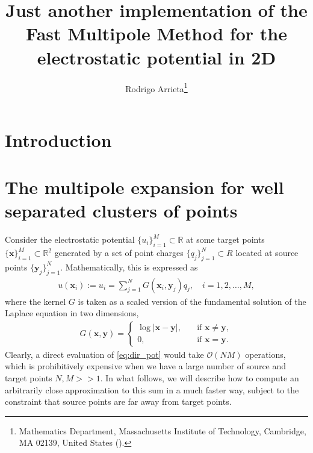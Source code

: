 \documentclass[final,onefignum,onetabnum]{siamart220329}
\title{Just another implementation of the Fast Multipole Method for the electrostatic potential in 2D}
\author{Rodrigo Arrieta\thanks{Mathematics Department, Massachusetts Institute of Technology, Cambridge, MA 02139,
		United States (\email{rarrieta@mit.edu}).}}
\newcommand{\bol}{\boldsymbol}
\newcommand{\R}{\mathbb{R}}
\newcommand{\Ocal}{\mathcal{O}}
\newcommand{\abs}[1]{\left|#1\right|}
\begin{document}
\maketitle

\begin{abstract}
\end{abstract}


\section{Introduction}
\label{sec:intro}

\section{The multipole expansion for well separated clusters of points}\label{sec:multipole}

Consider the electrostatic potential $\{u_i\}_{i=1}^M \subset \R$ at some target points $\{\bol{x}\}_{i=1}^M \subset \R^2$ generated by a set of point charges $\{q_j\}_{j=1}^N \subset R$ located at source points $\{\bol y_j\}_{j=1}^N$. Mathematically, this is expressed as
\begin{align}
	u(\bol x_i) := u_i = \sum_{j=1}^{N} G(\bol x_i, \bol y_j)q_j, \quad i = 1,2,\dots,M, \label{eq:dir_pot}
\end{align}
where the kernel $G$ is taken as a scaled version of the fundamental solution of the Laplace equation in two dimensions,
\begin{align}
	G(\bol x, \bol y) = \begin{cases}
		\log \abs{\bol x-\bol y}, \quad &\text{if } \bol x \neq \bol y,\\
		0 , \quad &\text{if } \bol x = \bol y.  \label{eq:rkernel}
	\end{cases}
\end{align}
Clearly, a direct evaluation of \cref{eq:dir_pot} would take $\Ocal(NM)$ operations, which is prohibitively expensive when we have a large number of source and target points $N,M >> 1$. In what follows, we will describe how to compute an arbitrarily close approximation to this sum in a much faster way, subject to the constraint that source points are far away from target points.
\end{document}
